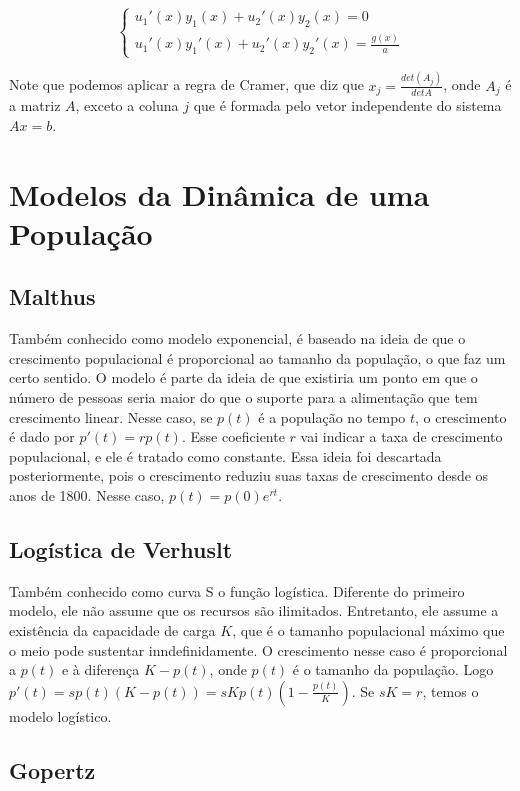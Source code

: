 \documentclass[12pt]{article}
\begin{document}
$$
\begin{cases}
u_1'(x)y_1(x) + u_2'(x)y_2(x) = 0 \\
u_1'(x)y_1'(x) + u_2'(x)y_2'(x) = \frac{g(x)}{a}    
\end{cases}
$$

Note que podemos aplicar a regra de Cramer, que diz que $x_j =
\frac{det(A_j)}{det{A}}$, onde $A_j$ é a matriz $A$, exceto a coluna $j$ que é
formada pelo vetor independente do sistema $Ax = b$. 

\section{Modelos da Dinâmica de uma População}

\subsection{Malthus} 
Também conhecido como modelo exponencial, é
baseado na ideia de que o crescimento populacional é proporcional ao
tamanho da população, o que faz um certo sentido. O modelo é parte da
ideia de que existiria um ponto em que o número de pessoas seria maior do
que o suporte para a alimentação que tem crescimento linear. Nesse caso,
se $p(t)$ é a população no tempo $t$, o crescimento é dado por $p'(t) =
rp(t)$. Esse coeficiente $r$ vai indicar a taxa de crescimento
populacional, e ele é tratado como constante. Essa ideia foi descartada
posteriormente, pois o crescimento reduziu suas taxas de crescimento desde
os anos de 1800. Nesse caso, $p(t) = p(0)e^{rt}$. 

\subsection{Logística de Verhuslt} 

Também conhecido como curva S o função logística. Diferente do primeiro
modelo, ele não assume que os
recursos são ilimitados. Entretanto, ele assume a existência da capacidade
de carga $K$, que é o tamanho populacional máximo que o meio pode
sustentar inndefinidamente. O crescimento nesse caso é proporcional a
$p(t)$ e à diferença $K - p(t)$, onde $p(t)$ é o tamanho da população.
Logo $p'(t) = sp(t)(K - p(t)) = sKp(t)(1 - \frac{p(t)}{K})$. Se $sK = r$,
temos o modelo logístico.

\subsection{Gopertz}
\end{document}
